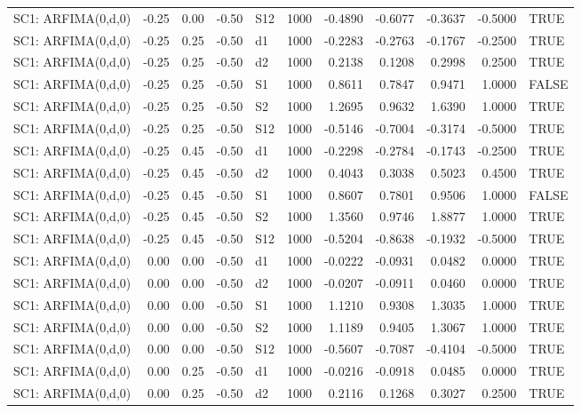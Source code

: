 \begin{table}[ht]
\begin{tabular}{lrrrlrrrrrl}
  SC1: ARFIMA(0,d,0) & -0.25 & 0.00 & -0.50 & S12 & 1000 & -0.4890 & -0.6077 & -0.3637 & -0.5000 & TRUE \\ 
  SC1: ARFIMA(0,d,0) & -0.25 & 0.25 & -0.50 & d1 & 1000 & -0.2283 & -0.2763 & -0.1767 & -0.2500 & TRUE \\ 
  SC1: ARFIMA(0,d,0) & -0.25 & 0.25 & -0.50 & d2 & 1000 & 0.2138 & 0.1208 & 0.2998 & 0.2500 & TRUE \\ 
  SC1: ARFIMA(0,d,0) & -0.25 & 0.25 & -0.50 & S1 & 1000 & 0.8611 & 0.7847 & 0.9471 & 1.0000 & FALSE \\ 
  SC1: ARFIMA(0,d,0) & -0.25 & 0.25 & -0.50 & S2 & 1000 & 1.2695 & 0.9632 & 1.6390 & 1.0000 & TRUE \\ 
  SC1: ARFIMA(0,d,0) & -0.25 & 0.25 & -0.50 & S12 & 1000 & -0.5146 & -0.7004 & -0.3174 & -0.5000 & TRUE \\ 
  SC1: ARFIMA(0,d,0) & -0.25 & 0.45 & -0.50 & d1 & 1000 & -0.2298 & -0.2784 & -0.1743 & -0.2500 & TRUE \\ 
  SC1: ARFIMA(0,d,0) & -0.25 & 0.45 & -0.50 & d2 & 1000 & 0.4043 & 0.3038 & 0.5023 & 0.4500 & TRUE \\ 
  SC1: ARFIMA(0,d,0) & -0.25 & 0.45 & -0.50 & S1 & 1000 & 0.8607 & 0.7801 & 0.9506 & 1.0000 & FALSE \\ 
  SC1: ARFIMA(0,d,0) & -0.25 & 0.45 & -0.50 & S2 & 1000 & 1.3560 & 0.9746 & 1.8877 & 1.0000 & TRUE \\ 
  SC1: ARFIMA(0,d,0) & -0.25 & 0.45 & -0.50 & S12 & 1000 & -0.5204 & -0.8638 & -0.1932 & -0.5000 & TRUE \\ 
  SC1: ARFIMA(0,d,0) & 0.00 & 0.00 & -0.50 & d1 & 1000 & -0.0222 & -0.0931 & 0.0482 & 0.0000 & TRUE \\ 
  SC1: ARFIMA(0,d,0) & 0.00 & 0.00 & -0.50 & d2 & 1000 & -0.0207 & -0.0911 & 0.0460 & 0.0000 & TRUE \\ 
  SC1: ARFIMA(0,d,0) & 0.00 & 0.00 & -0.50 & S1 & 1000 & 1.1210 & 0.9308 & 1.3035 & 1.0000 & TRUE \\ 
  SC1: ARFIMA(0,d,0) & 0.00 & 0.00 & -0.50 & S2 & 1000 & 1.1189 & 0.9405 & 1.3067 & 1.0000 & TRUE \\ 
  SC1: ARFIMA(0,d,0) & 0.00 & 0.00 & -0.50 & S12 & 1000 & -0.5607 & -0.7087 & -0.4104 & -0.5000 & TRUE \\ 
  SC1: ARFIMA(0,d,0) & 0.00 & 0.25 & -0.50 & d1 & 1000 & -0.0216 & -0.0918 & 0.0485 & 0.0000 & TRUE \\ 
  SC1: ARFIMA(0,d,0) & 0.00 & 0.25 & -0.50 & d2 & 1000 & 0.2116 & 0.1268 & 0.3027 & 0.2500 & TRUE \\ 

\end{tabular}
\end{table}

